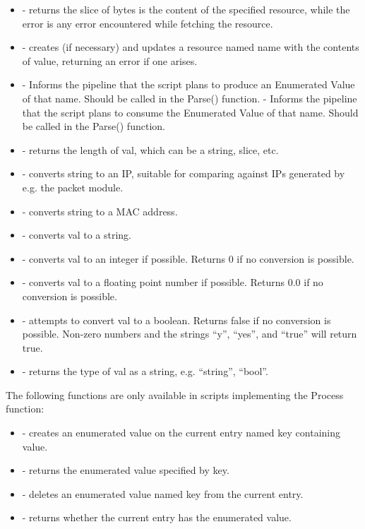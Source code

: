 \begin{itemize}
\tightlist
\item
   - returns the slice of bytes
  is the content of the specified resource, while the error is any error
  encountered while fetching the resource.
\item
   - creates (if necessary) and updates
  a resource named name with the contents of value, returning an error
  if one arises.
\item
   - Informs the pipeline that the script plans to produce an Enumerated Value of that name. Should be called in the Parse() function.
   - Informs the pipeline that the script plans to consume the Enumerated Value of that name. Should be called in the Parse() function.
\item
   - returns the length of val, which can be a string,
  slice, etc.
\item
   - converts string to an IP, suitable for comparing
  against IPs generated by e.g. the packet module.
\item
   - converts string to a MAC address.
\item
   - converts val to a string.
\item
   - converts val to an integer if possible. Returns
  0 if no conversion is possible.
\item
   - converts val to a floating point number
  if possible. Returns 0.0 if no conversion is possible.
\item
   - attempts to convert val to a boolean. Returns
  false if no conversion is possible. Non-zero numbers and the strings
  ``y'', ``yes'', and ``true'' will return true.
\item
   - returns the type of val as a string, e.g.
  ``string'', ``bool''.
\end{itemize}

The following functions are only available in scripts implementing the
Process function:

\begin{itemize}
\tightlist
\item
   - creates an enumerated value on the
  current entry named key containing value.
\item
   - returns the enumerated value
  specified by key.
\item
   - deletes an enumerated value named key from the
  current entry.
\item
   - returns whether the current entry has the
  enumerated value.
\end{itemize}

